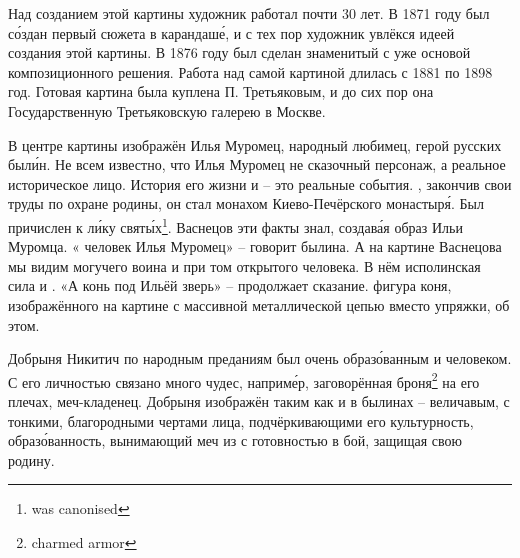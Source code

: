Над созданием этой картины художник работал почти 30 лет. В 1871 году был с\'{о}здан первый  сюжета в карандаш\'{е}, и с тех пор художник увлёкся идеей создания этой картины. В 1876 году был сделан знаменитый  с уже  основой композиционного решения. Работа над самой картиной длилась с 1881 по 1898 год. Готовая картина была куплена П. Третьяковым, и до сих пор она  Государственную Третьяковскую галерею в Москве.

В центре картины изображён Илья Муромец, народный любимец, герой русских был\'{и}н. Не всем известно, что Илья Муромец не сказочный персонаж, а реальное историческое лицо. История его жизни и   -- это реальные события. , закончив свои труды по охране родины, он стал монахом Киево-Печёрского монастыр\'{я}. Был причислен к л\'{и}ку свят\'{ы}х\footnote{was canonised}. Васнецов эти факты знал, создав\'{а}я образ Ильи Муромца. « человек Илья Муромец» -- говорит былина. А на картине Васнецова мы видим могучего воина и при том  открытого человека. В нём  исполинская сила и . «А конь под Ильёй  зверь» -- продолжает сказание.  фигура коня, изображённого на картине с массивной металлической цепью вместо упряжки,  об этом.

Добрыня Никитич по народным преданиям был очень образ\'{о}ванным и  человеком. С его личностью связано много чудес, наприм\'{е}р, заговорённая броня\footnote{charmed armor} на его плечах,  меч-кладенец. Добрыня изображён таким как и в былинах -- величавым, с тонкими, благородными чертами лица, подчёркивающими его культурность, образ\'{о}ванность,  вынимающий меч из  с готовностью  в бой, защищая свою родину.

